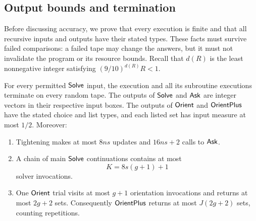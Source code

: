 \subsection{Output bounds and termination}
\label{alg:termination-subsection}

Before discussing accuracy, we prove that every execution is finite and
that all recursive inputs and outputs have their stated types. These
facts must survive failed comparisons: a failed tape may change the
answers, but it must not invalidate the program or its resource bounds.
Recall that $d(R)$ is the least nonnegative integer satisfying
$(9/10)^{d(R)}R<1$.

\begin{proposition}\label{prop:termination}
For every permitted $\mathsf{Solve}$ input, the execution and all its subroutine
executions terminate on every random tape. The outputs of $\mathsf{Solve}$
and $\mathsf{Ask}$ are integer vectors in their respective input boxes.
The outputs of $\mathsf{Orient}$ and $\mathsf{OrientPlus}$ have the stated choice
and list types, and each listed set has input measure at most $1/2$.
Moreover:
\begin{enumerate}[label=(\roman*)]
\item Tightening makes at most $8ns$ updates and $16ns+2$ calls to
$\mathsf{Ask}$.
\item A chain of main $\mathsf{Solve}$ continuations contains at most
\begin{equation}\label{eq:main-chain-length}
 K=8s(g+1)+1
\end{equation}
solver invocations.
\item One $\mathsf{Orient}$ trial visits at most $g+1$ orientation invocations
and returns at most $2g+2$ sets. Consequently $\mathsf{OrientPlus}$ returns
at most $J(2g+2)$ sets, counting repetitions.
\end{enumerate}
\end{proposition}

